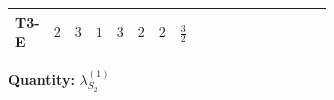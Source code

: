 \documentclass[8pt]{article}
\begin{document}
\begin{landscape}
\begin{longtable}{@{}llcccccc >{\raggedright\arraybackslash}p{0.21\linewidth} >{\raggedright\arraybackslash}p{0.21\linewidth} >{\raggedright\arraybackslash}p{0.21\linewidth}@{}}
\midrule
T3-E & $2$ & $3$ & $1$ & $3$ & $2$ & $2$ & $\frac{3}{2}$ & \scriptsize\adjustbox{max width=\linewidth}{$\begin{gathered} +\frac{3 {\lambda_{HS_2}^{(A)}}^2}{2}\end{gathered}$} & \scriptsize\adjustbox{max width=\linewidth}{$\begin{gathered} +14 {\lambda_{S_2}^{(1)}}^2\end{gathered}$} & \scriptsize\adjustbox{max width=\linewidth}{$\begin{gathered} +26 {\lambda_{S_2}^{(A)}}^2\end{gathered}$} \\
\midrule
\bottomrule
\end{longtable}
\clearpage
\noindent\textbf{Quantity: }$\lambda_{S_2}^{(1)}$\par\smallskip

\end{landscape}
\end{document}
